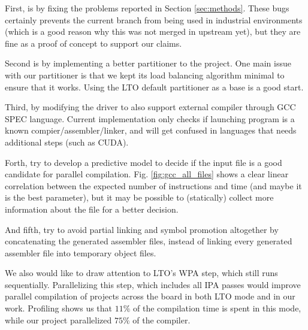 \documentclass[runningheads]{llncs}
\begin{document}
First, is by fixing the problems reported in Section \ref{sec:methods}. These bugs
certainly prevents the current branch from being used in industrial environments (which is a
good reason why this was not merged in upstream yet), but they are fine as a
proof of concept to support our claims.

Second is by implementing a better partitioner to the project. One main issue
with our partitioner is that we kept its load balancing algorithm minimal to
ensure that it works. Using the LTO default partitioner as a base is a good start.

Third, by modifying the driver to also support external compiler through GCC
SPEC language. Current implementation only checks if launching program
is a known compier/assembler/linker, and will get confused in languages that
needs additional steps (such as CUDA).

Forth, try to develop a predictive model to decide if the input file is
a good candidate for parallel compilation. Fig. \ref{fig:gcc_all_files} shows
a clear linear correlation between the expected number of instructions and time
(and maybe it is the best parameter), but it may be possible to (statically)
collect more information about the file for a better decision.

And fifth, try to avoid partial linking and symbol promotion altogether
by concatenating the generated assembler files, instead of linking every
generated assembler file into temporary object files.

We also would like to draw attention to LTO's WPA step, which still runs
sequentially. Parallelizing this step, which includes all IPA passes would
improve parallel compilation of projects across the board in both LTO mode and
in our work. Profiling shows us that $11\%$ of the compilation time is spent in
this mode, while our project parallelized $75\%$ of the compiler.

%
%
%
% 
% 
%
%
%
%
%



\end{document}
